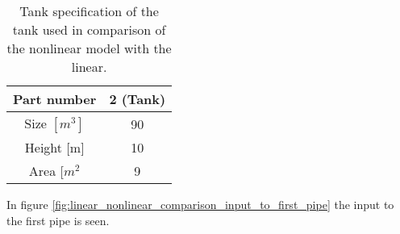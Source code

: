 \begin{table}[H]
\centering
\begin{tabular}{|c|c|}
\hline
Part number& 2 (Tank)  \\ \hline
Size $[m^3]$                                              & 90 \\ \hline
Height {[}m{]}                                             & 10 \\ \hline
Area {[}$m^2$                                              & 9  \\ \hline
\end{tabular}
\caption{Tank specification of the tank used in comparison of the nonlinear model with the linear. }
\label{tab:tank_data_nonlinear_linear_test}
\end{table}




%  


%  
 


In figure \ref{fig:linear_nonlinear_comparison_input_to_first_pipe} the input to the first pipe is seen. 

